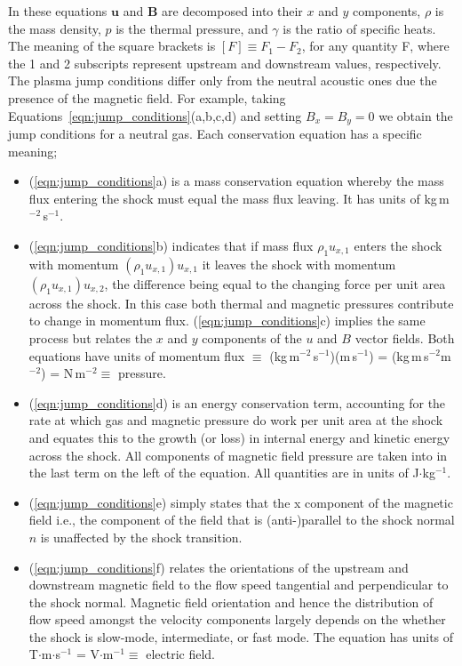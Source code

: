 In these equations $\mathbf{u}$ and $\mathbf{B}$ are decomposed into their $x$ and $y$ components, $\rho$ is the mass density, $p$ is the thermal pressure, and $\gamma$ is the ratio of specific heats. The meaning of the square brackets is $[F]\equiv F_{1}-F_{2}$, for any quantity F, where the 1 and 2 subscripts represent upstream and downstream values, respectively. The plasma jump conditions differ only from the neutral acoustic ones due the presence of the magnetic field. For example, taking Equations~\ref{eqn:jump_conditions}(a,b,c,d) and setting $B_{x}=B_{y}=0$ we obtain the jump conditions for a neutral gas. Each conservation equation has a specific meaning; 
\begin{itemize}
\item (\ref{eqn:jump_conditions}a) is a mass conservation equation whereby the mass flux entering the shock must equal the mass flux leaving. It has units of kg\,m$^{-2}$\,s$^{-1}$.
\item (\ref{eqn:jump_conditions}b) indicates that if mass flux $\rho_{1} u_{x,1}$ enters the shock with momentum $(\rho_{1} u_{x,1})u_{x,1}$ it leaves the shock with momentum $(\rho_{1} u_{x,1})u_{x,2}$, the difference being equal to the changing force per unit area across the shock. In this case both thermal and magnetic pressures contribute to change in momentum flux. (\ref{eqn:jump_conditions}c) implies the same process but relates the $x$ and $y$ components of the $u$ and $B$ vector fields. Both equations have units of momentum flux $\equiv$ (kg\,m$^{-2}$\,s$^{-1}$)(m\,s$^{-1}$) = (kg\,m\,s$^{-2}$m$^{-2}$) = N\,m$^{-2}\equiv$ pressure.
\item (\ref{eqn:jump_conditions}d) is an energy conservation term, accounting for the rate at which gas and magnetic pressure do work per unit area at the shock and equates this to the growth (or loss) in internal energy and kinetic energy across the shock. All components of magnetic field pressure are taken into in the last term on the left of the equation. All quantities are in units of J$\cdot$kg$^{-1}$.
\item (\ref{eqn:jump_conditions}e) simply states that the x component of the magnetic field i.e., the component of the field that is (anti-)parallel to the shock normal $\hat{n}$ is unaffected by the shock transition. 
\item (\ref{eqn:jump_conditions}f) relates the orientations of the upstream and downstream magnetic field to the flow speed tangential and perpendicular to the shock normal. Magnetic field orientation and hence the distribution of flow speed amongst the velocity components largely depends on the whether the shock is slow-mode, intermediate, or fast mode. The equation has units of T$\cdot$m$\cdot$s$^{-1}$ = V$\cdot$m$^{-1}\equiv$ electric field.
\end{itemize}

